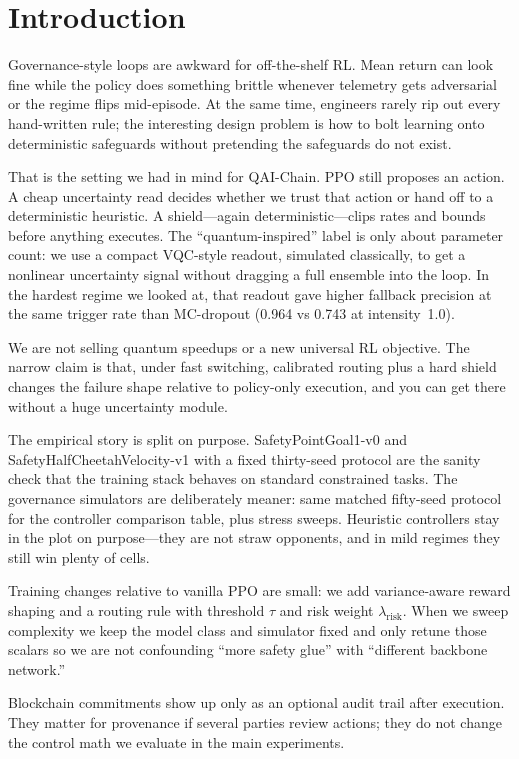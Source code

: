 \section{Introduction}

Governance-style loops are awkward for off-the-shelf RL. Mean return can look fine while the policy does something brittle whenever telemetry gets adversarial or the regime flips mid-episode. At the same time, engineers rarely rip out every hand-written rule; the interesting design problem is how to bolt learning onto deterministic safeguards without pretending the safeguards do not exist.

That is the setting we had in mind for QAI-Chain. PPO still proposes an action. A cheap uncertainty read decides whether we trust that action or hand off to a deterministic heuristic. A shield---again deterministic---clips rates and bounds before anything executes. The ``quantum-inspired'' label is only about parameter count: we use a compact VQC-style readout, simulated classically, to get a nonlinear uncertainty signal without dragging a full ensemble into the loop. In the hardest regime we looked at, that readout gave higher fallback precision at the same trigger rate than MC-dropout (0.964 vs 0.743 at intensity~1.0).

We are not selling quantum speedups or a new universal RL objective. The narrow claim is that, under fast switching, calibrated routing plus a hard shield changes the failure shape relative to policy-only execution, and you can get there without a huge uncertainty module.

The empirical story is split on purpose. SafetyPointGoal1-v0 and SafetyHalfCheetahVelocity-v1 with a fixed thirty-seed protocol are the sanity check that the training stack behaves on standard constrained tasks. The governance simulators are deliberately meaner: same matched fifty-seed protocol for the controller comparison table, plus stress sweeps. Heuristic controllers stay in the plot on purpose---they are not straw opponents, and in mild regimes they still win plenty of cells.

Training changes relative to vanilla PPO are small: we add variance-aware reward shaping and a routing rule with threshold $\tau$ and risk weight $\lambda_{\mathrm{risk}}$. When we sweep complexity we keep the model class and simulator fixed and only retune those scalars so we are not confounding ``more safety glue'' with ``different backbone network.''

Blockchain commitments show up only as an optional audit trail after execution. They matter for provenance if several parties review actions; they do not change the control math we evaluate in the main experiments.

